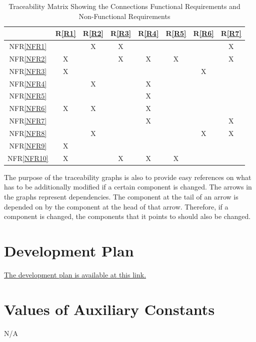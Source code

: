 \documentclass[12pt]{article}
\newcommand{\frref}[1]{R\ref{#1}}
\newcommand{\nfrref}[1]{NFR\ref{#1}}
\begin{document}
\begin{table}[h!]
	\centering
	\begin{tabular}{|c|c|c|c|c|c|c|c|}
	\hline
		& \frref{R1}& \frref{R2}& \frref{R3}& \frref{R4}& \frref{R5}& \frref{R6}& \frref{R7} \\
	\hline                    %
	\nfrref{NFR1}         &   & X& X&   &   &   & X\\ \hline
	\nfrref{NFR2}         & X&   & X& X&  X&   & X\\ \hline
	\nfrref{NFR3}         & X&   &   &   &   & X&   \\ \hline
	\nfrref{NFR4}         &   & X&   & X&   &   &   \\ \hline
	\nfrref{NFR5}         &   &   &   &  X &   &   &   \\ \hline
	\nfrref{NFR6}         &  X &  X &   &  X &   &   &   \\ \hline
	\nfrref{NFR7}         &   &   &   & X  &   &   &X   \\ \hline
	\nfrref{NFR8}         &   &   X&   &   &   & X  &X   \\ \hline
	\nfrref{NFR9}         &   X&   &   &   &   &   &   \\ \hline 
	\nfrref{NFR10}       &  X &   & X  & X  & X  &   &   \\ 
	\hline
	\end{tabular}
	\caption{Traceability Matrix Showing the Connections Functional Requirements and Non-Functional Requirements}
	\label{Table:R_trace}

\end{table}

The purpose of the traceability graphs is also to provide easy references on
what has to be additionally modified if a certain component is changed.  The
arrows in the graphs represent dependencies. The component at the tail of an
arrow is depended on by the component at the head of that arrow. Therefore, if a
component is changed, the components that it points to should also be
changed.

\section{Development Plan}
\label{Dev_Plan}

\href{https://github.com/zakerl/Capstone_Project/blob/main/docs/DevelopmentPlan/DevelopmentPlan.pdf}{The development plan is available at this link.}

\section{Values of Auxiliary Constants}
\label{VAC}
N/A
\end{document}
